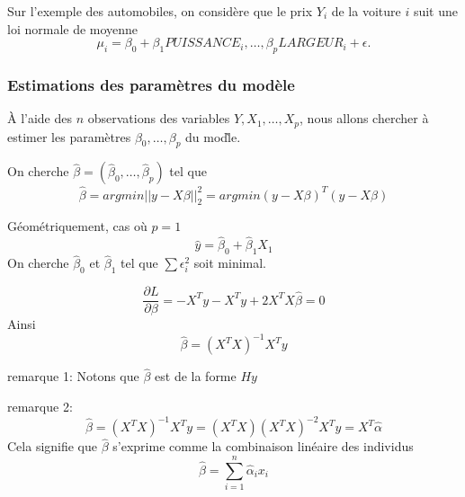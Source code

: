 \documentclass{article}
\begin{document}
Sur l'exemple des automobiles, on consid\`ere que le prix $Y_i$ de la voiture $i$ suit une loi normale de moyenne
\begin{equation}
\mu_i=\beta_0+\beta_1 PUISSANCE_i,\ldots,\beta_p LARGEUR_i+\epsilon.
\end{equation} 

\subsubsection{Estimations des param\`etres du mod\`ele}
\`A l'aide des $n$ observations des variables $Y,X_1,\ldots,X_p$, nous allons chercher \`a estimer les param\`etres $\beta_0,\ldots,\beta_p$ du mod\`le.

On cherche $\hat{\beta}=(\hat{\beta}_0,\ldots,\hat{\beta}_p)$ tel que 
\begin{equation}
\hat{\beta}=argmin ||y-X\beta||_2^2=argmin (y-X\beta)^T(y-X\beta)
\end{equation}

G\'eom\'etriquement, cas o\`u $p=1$
\begin{equation}
\hat{y}=\hat{\beta}_0+\hat{\beta}_1 X_1
\end{equation}
On cherche $\hat{\beta}_0$ et $\hat{\beta}_1$ tel que $\sum \epsilon_i^2$ soit minimal.

\begin{equation}
\frac{\partial L}{\partial \beta}=-X^Ty-X^Ty+2X^TX\hat{\beta}=0
\end{equation}
Ainsi
\begin{equation}
\hat{\beta}=(X^TX)^{-1}X^Ty
\end{equation}

remarque 1: Notons que $\hat{\beta}$ est de la forme $Hy$

remarque 2:
\begin{equation}
\hat{\beta}=(X^TX)^{-1}X^Ty=(X^TX)(X^TX)^{-2}X^Ty=X^T\hat{\alpha}
\end{equation}
Cela signifie que $\hat{\beta}$ s'exprime comme la combinaison lin\'eaire des individus
\begin{equation}
\hat{\beta}=\sum_{i=1}^n \hat{\alpha}_ix_i
\end{equation}
\end{document}
